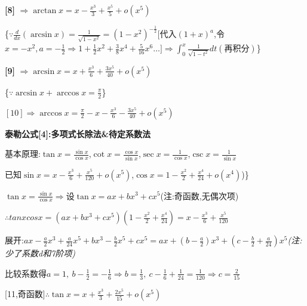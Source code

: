 \documentclass[11pt,a4paper,UTF8]{ctexart}
\begin{document}
\begin{solbox}[{分步推导与答题规范}]
\textbf{[8]} $\Rightarrow \arctan x = x - \frac{x^3}{3} + \frac{x^5}{5} + o(x^5)$
\end{solbox}

\{$\because\frac{d}{dx}(\arcsin x) = \frac{1}{\sqrt{1-x^2}} = (1-x^2)^{-\frac{1}{2}}$[代入$(1+x)^a$,令$x = -x^2, a = -\frac{1}{2} \Rightarrow 1 + \frac{1}{2}x^2 + \frac{3}{8}x^4 + \frac{5}{16}x^6 \dots ]\Rightarrow \int_{0}^{x} \frac{1}{\sqrt{1-t^2}} dt(\text{再积分})$\}

\begin{solbox}[{分步推导与答题规范}]
\textbf{[9]} $\Rightarrow \arcsin x = x + \frac{x^3}{6} + \frac{3x^5}{40} + o(x^5)$
\end{solbox}

\{$\because\arcsin x + \arccos x = \frac{\pi}{2}$\}

\begin{solbox}[{分步推导与答题规范}]
  $[10]\Rightarrow \arccos x = \frac{\pi}{2} - x - \frac{x^3}{6} - \frac{3x^5}{40} + o(x^5)$
\end{solbox}

\textbf{泰勒公式[4]:多项式长除法\&待定系数法}

基本原理:$\tan x = \frac{\sin x}{\cos x}$,$\cot x = \frac{\cos x}{\sin x}$,$\sec x = \frac{1}{\cos x}$,$\csc x = \frac{1}{\sin x}$

\begin{solbox}[{分步推导与答题规范}]
  已知$\sin x = x - \frac{x^3}{6} + \frac{x^5}{120} + o(x^5)$,$\cos x = 1 - \frac{x^2}{2} + \frac{x^4}{24} + o(x^4)$)\}
\end{solbox}

$\tan x = \frac{\sin x}{\cos x} \Rightarrow$设$\tan x = ax + bx^3 + cx^5$(注:奇函数,无偶次项)

\begin{solbox}[{分步推导与答题规范}]
  $\therefore tanxcosx = (ax + bx^3 + cx^5)(1 - \frac{x^2}{2} + \frac{x^4}{24}) = x - \frac{x^3}{6} + \frac{x^5}{120}$

  展开:$ax - \frac{a}{2}x^3 + \frac{a}{24}x^5 + bx^3 - \frac{b}{2}x^5 + cx^5 = ax + (b-\frac{a}{2})x^3 + (c-\frac{b}{2}+\frac{a}{24})x^5$\textit{(注:少了系数d和7阶项)}

  比较系数得$a=1,\ b-\frac{1}{2}=-\frac{1}{6} \Rightarrow b=\frac{1}{3},\ c-\frac{1}{6}+\frac{1}{24}=\frac{1}{120} \Rightarrow c=\frac{2}{15}$
\end{solbox}

[11,奇函数]$\therefore \tan x = x + \frac{x^3}{3} + \frac{2x^5}{15} + o(x^5)$
\end{document}
